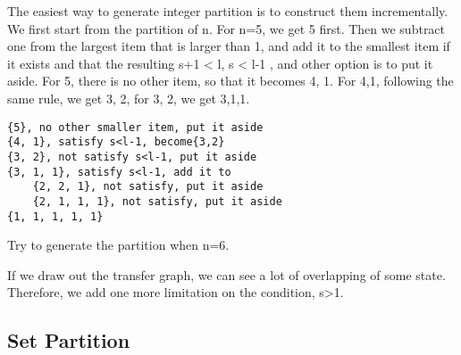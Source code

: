 \documentclass[../main.tex]{subfiles}
\begin{document}
The easiest way to generate integer partition is to construct them incrementally. We first start from the partition of {n}. For n=5, we get {5} first. Then we subtract one from the largest item that is larger than 1, and add it to the smallest item if it exists and that the resulting s+1 < l, s < l-1 , and other option is to put it aside.  For {5}, there is no other item, so that it becomes {4, 1}. For {4,1}, following the same rule, we get {3, 2},  for {3, 2}, we get {3,1,1}.
\begin{lstlisting}
{5}, no other smaller item, put it aside
{4, 1}, satisfy s<l-1, become{3,2}
{3, 2}, not satisfy s<l-1, put it aside
{3, 1, 1}, satisfy s<l-1, add it to
    {2, 2, 1}, not satisfy, put it aside
    {2, 1, 1, 1}, not satisfy, put it aside
{1, 1, 1, 1, 1}
\end{lstlisting}
\begin{bclogo}[couleur = blue!30, arrondi=0.1,logo=\bccrayon,ombre=true]{Try to generate the partition when n=6.} 
\end{bclogo}
If we draw out the transfer graph, we can see a lot of overlapping of some state. Therefore, we add one more limitation on the condition, s>1. 



\subsection{Set Partition}
\end{document}
